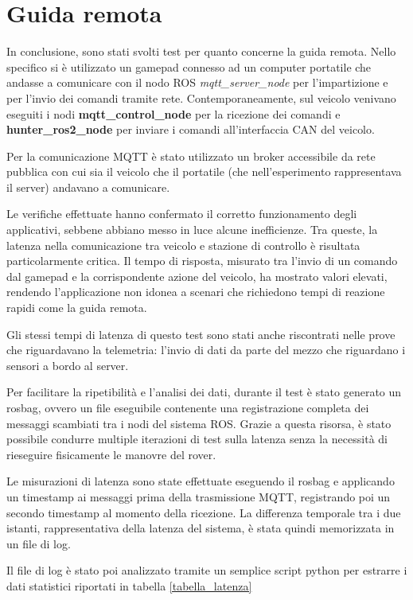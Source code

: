 \section{Guida remota}
In conclusione, sono stati svolti test per quanto concerne la guida remota. Nello specifico si è utilizzato un gamepad connesso ad un computer portatile che andasse a comunicare con il nodo ROS \textit{mqtt\_server\_node} per l'impartizione e per l'invio dei comandi tramite rete. Contemporaneamente, sul veicolo venivano eseguiti i nodi \textbf{mqtt\_control\_node} per la ricezione dei comandi e \textbf{hunter\_ros2\_node} per inviare i comandi all'interfaccia CAN del veicolo.

\noindent Per la comunicazione MQTT è stato utilizzato un broker accessibile da rete pubblica con cui sia il veicolo che il portatile (che nell'esperimento rappresentava il server) andavano a comunicare. 

\noindent Le verifiche effettuate hanno confermato il corretto funzionamento degli applicativi, sebbene abbiano messo in luce alcune inefficienze. Tra queste, la latenza nella comunicazione tra veicolo e stazione di controllo è risultata particolarmente critica. Il tempo di risposta, misurato tra l'invio di un comando dal gamepad e la corrispondente azione del veicolo, ha mostrato valori elevati, rendendo l'applicazione non idonea a scenari che richiedono tempi di reazione rapidi come la guida remota.

\noindent Gli stessi tempi di latenza di questo test sono stati anche riscontrati nelle prove che riguardavano la telemetria: l'invio di dati da parte del mezzo che riguardano i sensori a bordo al server.

\noindent Per facilitare la ripetibilità e l'analisi dei dati, durante il test è stato generato un rosbag, ovvero un file eseguibile contenente una registrazione completa dei messaggi scambiati tra i nodi del sistema ROS. Grazie a questa risorsa, è stato possibile condurre multiple iterazioni di test sulla latenza senza la necessità di rieseguire fisicamente le manovre del rover.

\noindent Le misurazioni di latenza sono state effettuate eseguendo il rosbag e applicando un timestamp ai messaggi prima della trasmissione MQTT, registrando poi un secondo timestamp al momento della ricezione. La differenza temporale tra i due istanti, rappresentativa della latenza del sistema, è stata quindi memorizzata in un file di log.

\noindent Il file di log è stato poi analizzato tramite un semplice script python per estrarre i dati statistici riportati in tabella \ref{tabella_latenza}

